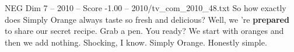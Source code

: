 \begin{textsample}{NEG Dim 7 – 2010 – Score -1.00 – 2010/tv\_com\_2010\_48.txt}  \label{ex:f7_neg_022}
So how exactly does Simply Orange always taste so fresh and delicious?
Well, we 're \textbf{prepared} to share our secret recipe.
Grab a pen.
You ready?
We start with oranges and then we add nothing.
Shocking, I know.
Simply Orange.
Honestly simple.

\end{textsample}
